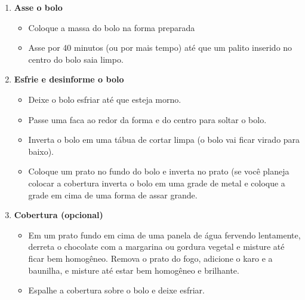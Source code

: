 \documentclass [11pt, letterpaper] {article}
\begin{document}
\begin{description}
\begin{enumerate}
\begin{itemize}
        \end{itemize}
        \item {\bf Asse o bolo}
	\begin{itemize}
        \item Coloque a massa do bolo na forma preparada 
        \item Asse por 40 minutos (ou por mais tempo) at\'e que um palito inserido no centro do bolo saia limpo.
        \end{itemize}
        \item {\bf Esfrie e desinforme o bolo}
        \begin{itemize}
        \item Deixe o bolo esfriar at\'e que esteja morno. 
        \item Passe uma faca ao redor da forma e do centro para soltar o bolo. 
        \item Inverta o bolo em uma t\'abua de cortar limpa (o bolo vai ficar virado para baixo).
        \item Coloque um prato no fundo do bolo e inverta no prato (se voc\^e planeja colocar a cobertura inverta o bolo em uma grade de metal e coloque a grade em cima de uma forma de assar grande. 
         \end{itemize}
        
         \item {\bf Cobertura (opcional)}
       	\begin{itemize}
        \item Em um prato fundo em cima de uma panela de \'agua fervendo lentamente, derreta o chocolate com a margarina ou gordura vegetal e misture at\'e ficar bem homog\^eneo. Remova o prato do fogo, adicione o karo e a baunilha, e misture at\'e estar bem homog\^eneo e brilhante.
        \item Espalhe a cobertura sobre o bolo e deixe esfriar.
         \end{itemize}
     	\end{enumerate}         
\end{description}
\end{document}
